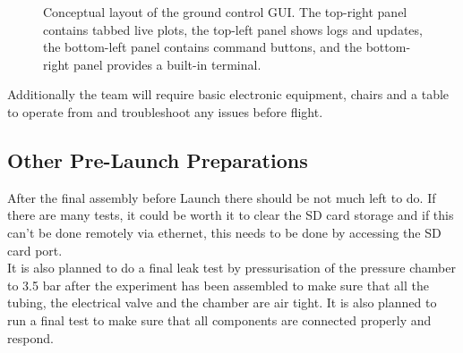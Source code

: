 \begin{figure}[H]
{%
}
\caption{Conceptual layout of the ground control GUI. The top-right panel contains tabbed live plots, the top-left panel shows logs and updates, the bottom-left panel contains command buttons, and the bottom-right panel provides a built-in terminal.}
\label{fig:ground_gui_mockup}
\end{figure}

Additionally the team will require basic electronic equipment, chairs and a table to operate from and troubleshoot any issues before flight. 

\subsection*{Other Pre-Launch Preparations}
After the final assembly before Launch there should be not much left to do. If there are many tests, it could be worth it to clear the SD card storage and if this can't be done remotely via ethernet, this needs to be done by accessing the SD card port. \\
It is also planned to do a final leak test by pressurisation of the pressure chamber to 3.5 bar after the experiment has been assembled to make sure that all the tubing, the electrical valve and the chamber are air tight. It is also planned to run a final test to make sure that all components are connected properly and respond. 

